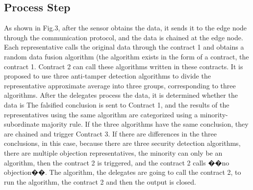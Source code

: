 \documentclass{ieeeaccess}
\begin{document}
\subsection{Process Step}
As shown in Fig.3, after the sensor obtains the data, it sends it to the edge node through the communication protocol, and the data is chained at the edge node. Each representative calls the original data through the contract 1 and obtains a random data fusion algorithm (the algorithm exists in the form of a contract, the contract 1. Contract 2 can call these algorithms written in these contracts. It is proposed to use three anti-tamper detection algorithms to divide the representative approximate average into three groups, corresponding to three algorithms. After the delegates process the data, it is determined whether the data is The falsified conclusion is sent to Contract 1, and the results of the representatives using the same algorithm are categorized using a minority-subordinate majority rule. If the three algorithms have the same conclusion, they are chained and trigger Contract 3. If there are differences in the three conclusions, in this case, because there are three security detection algorithms, there are multiple objection representatives, the minority can only be an algorithm, then the contract 2 is triggered, and the contract 2 calls ��no objection��. The algorithm, the delegates are going to call the contract 2, to run the algorithm, the contract 2 and then the output is closed. 
\end{document}
